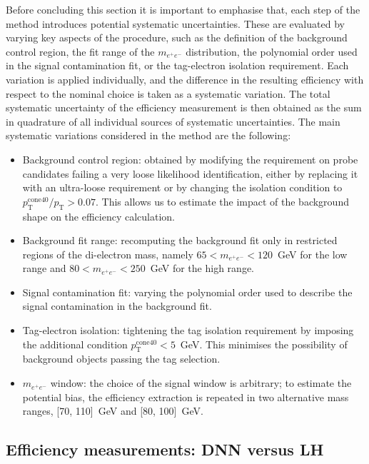 Before concluding this section it is important to emphasise that, each step of the method introduces potential systematic uncertainties. These are evaluated by varying key aspects of the procedure, such as the definition of the background control region, the fit range of the $m_{e^+e^-}$ distribution, the polynomial order used in the signal contamination fit, or the tag-electron isolation requirement. 
Each variation is applied individually, and the difference in the resulting efficiency with respect to the nominal choice is taken as a systematic variation. The total systematic uncertainty of the efficiency measurement is then obtained as the sum in quadrature of all individual sources of systematic uncertainties. The main systematic variations considered in the \zmass method are the following:
\begin{itemize}
  \item Background control region: obtained by modifying the requirement on probe candidates failing a very loose likelihood identification, either by replacing it with an ultra-loose requirement or by changing the isolation condition to $p_{\mathrm{T}}^{\mathrm{cone40}}/p_{\mathrm{T}} > 0.07$. This allows us to estimate the impact of the background shape on the efficiency calculation.
  \item Background fit range: recomputing the background fit only in restricted regions of the di-electron mass, namely $65 < m_{e^+e^-} < 120$~GeV for the low range and $80 < m_{e^+e^-} < 250$~GeV for the high range.
  \item Signal contamination fit: varying the polynomial order used to describe the signal contamination in the background fit.
  \item Tag-electron isolation: tightening the tag isolation requirement by imposing the additional condition $p_{\mathrm{T}}^{\mathrm{cone40}} < 5$~GeV. This minimises the possibility of background objects passing the tag selection.
  \item $m_{e^+e^-}$ window: the choice of the signal window is arbitrary; to estimate the potential bias, the efficiency extraction is repeated in two alternative mass ranges, [70, 110]~GeV and [80, 100]~GeV.
\end{itemize}

\subsection{Efficiency measurements: DNN versus LH}
\label{eff_meas}


